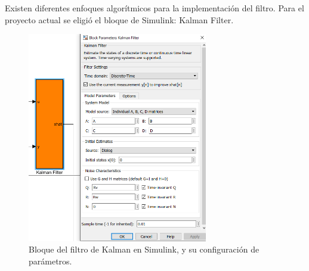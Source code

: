 \documentclass{article}
\begin{document}
\begin{sloppypar}
Existen diferentes enfoques algorítmicos para la implementación del filtro. Para el proyecto actual se eligió el bloque de Simulink: Kalman Filter.

\begin{figure}[H]
    \centering
    \includegraphics[width=0.7\textwidth]{Bloque del filtro de Kalman en Simulink, y su configuración de parámetros}
    \caption{Bloque del filtro de Kalman en Simulink, y su configuración de parámetros.}
    \label{fig:Bloque del filtro de Kalman en Simulink, y su configuración de parámetros}
\end{figure}







\end{sloppypar}
\end{document}
